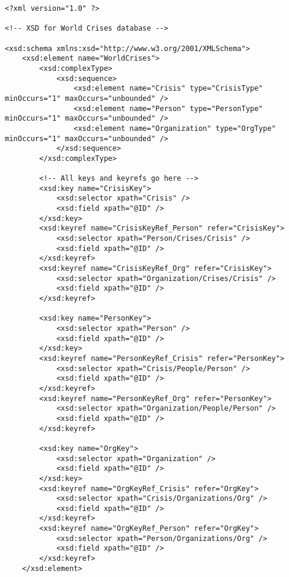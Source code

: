 \documentclass{article}
\begin{document}
\begin{lstlisting}
<?xml version="1.0" ?>

<!-- XSD for World Crises database -->

<xsd:schema xmlns:xsd="http://www.w3.org/2001/XMLSchema">
    <xsd:element name="WorldCrises">
        <xsd:complexType>
            <xsd:sequence>
                <xsd:element name="Crisis" type="CrisisType" minOccurs="1" maxOccurs="unbounded" />
                <xsd:element name="Person" type="PersonType" minOccurs="1" maxOccurs="unbounded" />
                <xsd:element name="Organization" type="OrgType" minOccurs="1" maxOccurs="unbounded" />
            </xsd:sequence>
        </xsd:complexType>
        
        <!-- All keys and keyrefs go here -->
        <xsd:key name="CrisisKey">
            <xsd:selector xpath="Crisis" />
            <xsd:field xpath="@ID" />
        </xsd:key>
        <xsd:keyref name="CrisisKeyRef_Person" refer="CrisisKey">
            <xsd:selector xpath="Person/Crises/Crisis" />
            <xsd:field xpath="@ID" />
        </xsd:keyref>
        <xsd:keyref name="CrisisKeyRef_Org" refer="CrisisKey">
            <xsd:selector xpath="Organization/Crises/Crisis" />
            <xsd:field xpath="@ID" />
        </xsd:keyref>
        
        <xsd:key name="PersonKey">
            <xsd:selector xpath="Person" />
            <xsd:field xpath="@ID" />
        </xsd:key>
        <xsd:keyref name="PersonKeyRef_Crisis" refer="PersonKey">
            <xsd:selector xpath="Crisis/People/Person" />
            <xsd:field xpath="@ID" />
        </xsd:keyref>
        <xsd:keyref name="PersonKeyRef_Org" refer="PersonKey">
            <xsd:selector xpath="Organization/People/Person" />
            <xsd:field xpath="@ID" />
        </xsd:keyref>
        
        <xsd:key name="OrgKey">
            <xsd:selector xpath="Organization" />
            <xsd:field xpath="@ID" />
        </xsd:key>
        <xsd:keyref name="OrgKeyRef_Crisis" refer="OrgKey">
            <xsd:selector xpath="Crisis/Organizations/Org" />
            <xsd:field xpath="@ID" />
        </xsd:keyref>
        <xsd:keyref name="OrgKeyRef_Person" refer="OrgKey">
            <xsd:selector xpath="Person/Organizations/Org" />
            <xsd:field xpath="@ID" />
        </xsd:keyref>
    </xsd:element>
    

\end{lstlisting}
\end{document}
